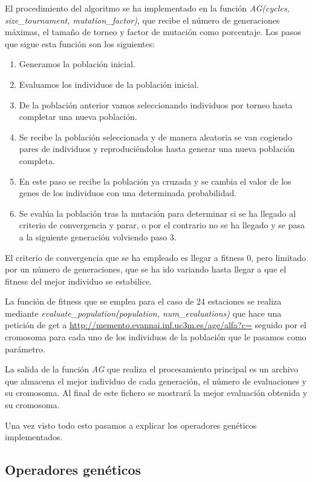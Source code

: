 \documentclass[12pt, spanish, pdftex]{UC3M_document}
\begin{document}
El procedimiento del algoritmo se ha implementado en la función \textit{AG(cycles, size\_tournament, mutation\_factor)}, que recibe el número de generaciones máximas, el tamaño de torneo y factor de mutación como porcentaje. Los pasos que sigue esta función son los siguientes:
\begin{enumerate}
	\item Generamos la población inicial.
	\item Evaluamos los individuos de la población inicial.
	\item De la población anterior vamos seleccionando individuos por torneo hasta completar una nueva población.
	\item Se recibe la población seleccionada y de manera aleatoria se van cogiendo pares de individuos y reproduciéndolos hasta generar una nueva población completa.
	\item En este paso se recibe la población ya cruzada y se cambia el valor de los genes de los individuos con una determinada probabilidad.
	\item Se evalúa la población tras la mutación para determinar si se ha llegado al criterio de convergencia y parar, o por el contrario no se ha llegado y se pasa a la siguiente generación volviendo paso 3.
\end{enumerate}

El criterio de convergencia que se ha empleado es llegar a fitness 0, pero limitado por un número de generaciones, que se ha ido variando hasta llegar a que el fitness del mejor individuo se estabilice.

La función de fitness que se emplea para el caso de 24 estaciones se realiza mediante \textit{evaluate\_population(population, num\_evaluations)} que hace una petición de get a \href{http://memento.evannai.inf.uc3m.es/age/alfa?c=}{http://memento.evannai.inf.uc3m.es/age/alfa?c=} seguido por el cromosoma para cada uno de los individuos de la población que le pasamos como parámetro.

La salida de la función \textit{AG} que realiza el procesamiento principal es un archivo que almacena el mejor individuo de cada generación, el número de evaluaciones y su cromosoma. Al final de este fichero se mostrará la mejor evaluación obtenida y su cromosoma.

Una vez visto todo esto pasamos a explicar los operadores genéticos implementados.
\pagebreak

\subsection{Operadores genéticos}
\end{document}
